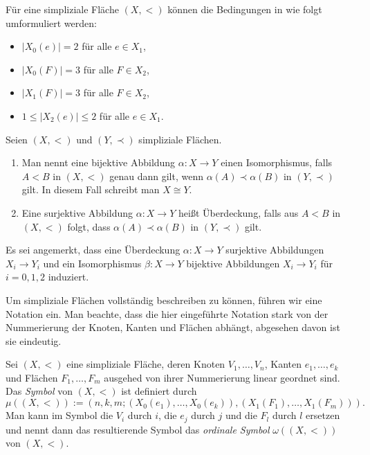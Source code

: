 \documentclass[12pt,titlepage]{article}
\begin{document}
\begin{bemerkung}
Für eine simpliziale Fläche $(X,<)$ können die Bedingungen in  wie folgt umformuliert werden:
\begin{itemize}
\item $\vert X_{0}(e)\vert=2$ für alle $e \in X_{1}$,
\item $\vert X_{0}(F)\vert=3$ für alle $F \in X_{2}$,
\item $\vert X_{1}(F)\vert=3$ für alle $F \in X_{2}$,
\item $1\leq  \vert X_{2}(e)\vert \leq 2$ für alle $e \in X_{1}$.

\end{itemize}
\end{bemerkung}

\begin{definition} Seien $(X,<)$ und $(Y,\prec)$ simpliziale Flächen.
\begin{enumerate}
 \item Man nennt eine bijektive Abbildung $\alpha: X \to Y$ einen Isomorphismus, falls $A<B$ in $(X,<)$ genau dann gilt, wenn $\alpha(A) \prec \alpha(B)$ in $(Y,\prec)$ gilt. In diesem Fall schreibt man $X \cong Y$.
\item Eine surjektive Abbildung $\alpha: X \to Y$ heißt Überdeckung, falls aus $A<B$ in $(X,<)$ folgt, dass $\alpha(A) \prec \alpha(B)$ in $(Y,\prec)$ gilt. 
\end{enumerate}
\end{definition}
Es sei angemerkt, dass eine Überdeckung $\alpha:X\to Y$ surjektive Abbildungen $X_{i} \to Y_{i}$ und ein Isomorphismus $\beta:X \to Y$ bijektive Abbildungen $X_{i} \to Y_{i}$ für $i=0,1,2$ induziert.

Um simpliziale Flächen vollständig beschreiben zu können, führen wir eine Notation ein. Man beachte, dass die hier eingeführte Notation stark von der Nummerierung der Knoten, Kanten und Flächen abhängt, abgesehen davon ist sie eindeutig.
\begin{definition}
 Sei $(X,<)$ eine simpliziale Fläche, deren Knoten $V_{1},\ldots,V_{n}$, Kanten $e_{1},\ldots,e_{k}$ und Flächen $F_{1},\ldots,F_{m}$ ausgehed von ihrer Nummerierung linear geordnet sind. Das \emph{Symbol} von $(X,<)$ ist definiert durch 
\[
\mu((X,<)):=(n,k,m;(X_{0}(e_{1}),\ldots,X_{0}(e_{k})),(X_{1}(F_{1}),\ldots,X_{1}(F_{m}))).
\]
Man kann im Symbol die $V_{i}$ durch $i$, die $e_{j}$ durch $j$ und die $F_{l}$ durch $l$ ersetzen und nennt dann das resultierende Symbol das \emph{ordinale Symbol} $\omega((X,<))$ von $(X,<)$.
\end{definition}
\end{document}

